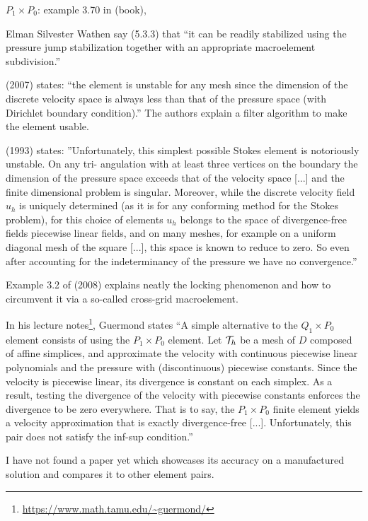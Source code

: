 
$P_1\times P_0$: example 3.70 in \textcite{john16} (book),


Elman Silvester Wathen say (5.3.3) that 
``it can be readily stabilized using the pressure jump
stabilization together with an appropriate macroelement subdivision.'' 

\textcite{qizh07b} (2007) states: ``the element is unstable for any mesh since
the dimension of the discrete velocity space is always less than that of the pressure space (with
Dirichlet boundary condition).'' The authors explain a filter algorithm to make the
element usable. 

\textcite{arno93} (1993) states: ''Unfortunately, this simplest possible Stokes element is notoriously unstable. On any tri-
angulation with at least three vertices on the boundary the dimension of the pressure
space exceeds that of the velocity space [...] and the finite
dimensional problem is singular. 
Moreover, while the discrete velocity field $u_h$ is uniquely
determined (as it is for any conforming method for the Stokes problem), for this choice of
elements $u_h$ belongs to the space of divergence-free fields piecewise linear fields, and on
many meshes, for example on a uniform diagonal mesh of the square [...],
this space is known to reduce to zero. So even after accounting for the indeterminancy of
the pressure we have no convergence.''

Example 3.2 of \textcite{bobf08} (2008) explains neatly the locking phenomenon and how 
to circumvent it via a so-called cross-grid macroelement.

In his lecture notes\footnote{\url{https://www.math.tamu.edu/~guermond/}}, 
Guermond states ``A simple alternative to the 
$Q_1\times P_0$ element consists of using the $P_1\times P_0$ element.
Let ${\cal T}_h$  be a mesh of $D$ composed of affine simplices, and approximate the 
velocity with continuous piecewise linear polynomials and the pressure with
(discontinuous) piecewise constants. Since the velocity is piecewise linear, its
divergence is constant on each simplex. As a result, testing the divergence
of the velocity with piecewise constants enforces the divergence to be zero
everywhere. That is to say, the $P_1\times P_0$ finite element yields a velocity 
approximation that is exactly divergence-free [...]. Unfortunately,
this pair does not satisfy the inf-sup condition.''

I have not found a paper yet which showcases its accuracy on a manufactured solution
and compares it to other element pairs.


